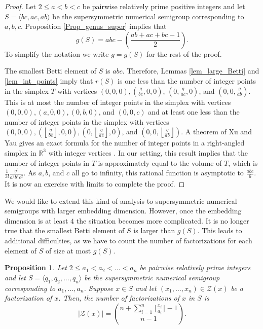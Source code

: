 \documentclass[12pt]{amsart}
\newcommand{\R}{{\mathbb R}}
\theoremstyle{plain}\newtheorem{proposition}{Proposition}[section]
\newtheorem{prop}[proposition]{Proposition}
\begin{document}
\begin{proof}
Let $2\le a< b< c$ be pairwise relatively prime positive integers and let $S = \langle bc,ac,ab\rangle$ be the supersymmetric numerical semigroup corresponding to $a,b,c$.  Proposition \ref{Prop_genus_super} implies that 
\[
g(S) = abc - \left(\frac{ab +ac+bc-1}{2}\right).
\]
To simplify the notation we write $g = g(S)$ for the rest of the proof.

The smallest Betti element of $S$ is $abc$.  Therefore, Lemmas \ref{lem_large_Betti} and \ref{lem_int_points} imply that $r(S)$ is one less than the number of integer points in the simplex $T$ with vertices $(0,0,0), \left(\frac{g}{bc},0,0\right)$,  $\left(0,\frac{g}{ac},0\right)$, and $ \left(0,0,\frac{g}{ab}\right)$.  This is at most the number of integer points in the simplex with vertices $(0,0,0),(a,0,0),(0,b,0)$, and $(0,0,c)$ and at least one less than the number of integer points in the simplex with vertices $(0,0,0), \left(\left\lfloor\frac{g}{bc}\right\rfloor,0,0\right),  \left(0,\left\lfloor\frac{g}{ac}\right\rfloor,0\right)$, and $ \left(0,0,\left\lfloor\frac{g}{ab}\right\rfloor\right)$.  A theorem of Xu and Yau gives an exact formula for the number of integer points in a right-angled simplex in $\R^3$ with integer vertices \cite{XuYau}.  In our setting, this result implies that the number of integer points in $T$ is approximately equal to the volume of $T$, which is $\frac{1}{3!} \frac{g^3}{a^2 b^2 c^2}$.  As $a,b$, and $c$ all go to infinity, this rational function is asymptotic to $\frac{abc}{6}$.  It is now an exercise with limits to complete the proof.
\end{proof}

We would like to extend this kind of analysis to supersymmetric numerical semigroups with larger embedding dimension.  However, once the embedding dimension is at least $4$ the situation becomes more complicated.  It is no longer true that the smallest Betti element of $S$ is larger than $g(S)$.  This leads to additional difficulties, as we have to count the number of factorizations for each element of $S$ of size at most $g(S)$.

\begin{prop}\label{Prop_count_factorizations}
Let $2\le a_1 < a_2 < \ldots < a_n$ be pairwise relatively prime integers and let $S=\langle q_1,q_2,...,q_n\rangle$ be the supersymmetric numerical semigroup corresponding to $a_1,\ldots, a_n$.  Suppose $x \in S$ and let $(x_1,\ldots, x_n) \in \mathcal{Z}(x)$ be a factorization of $x$.  Then, the number of factorizations of $x$ in $S$ is
\[
|\mathcal{Z}(x)| = \binom{n+\sum\limits_{i=1}^n\big\lfloor \frac{x_i}{a_i}\big\rfloor-1}{n-1}.
\]
\end{prop}
\end{document}
